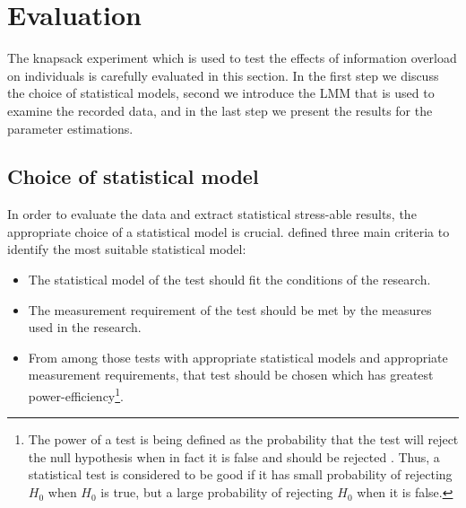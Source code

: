 
\chapter{Evaluation}
\label{ch:Evaluation}

The knapsack experiment which is used to test the effects of information overload on individuals is carefully evaluated in this section. In the first step we discuss the choice of statistical models, second we introduce the \acf{LMM} that is used to examine the recorded data, and in the last step we present the results for the parameter estimations. 

\section{Choice of statistical model}
\label{ch:Evaluation:sec:StatisticalModel}

In order to evaluate the data and extract statistical stress-able results, the appropriate choice of a statistical model is crucial. 
\cite{Siegel1957} defined three main criteria to identify the most suitable statistical model:
\begin{itemize}
\item The statistical model of the test should fit the conditions of the research.
\item The measurement requirement of the test should be met by the measures used in the research.
\item From among those tests with appropriate statistical models and appropriate measurement requirements, that test should be chosen which has greatest power-efficiency\footnote{The power of a test is being defined as the probability that the test will reject the null hypothesis when in fact it is false and should be rejected \citep{Siegel1957}. Thus, a statistical test is considered to be good if it has small probability of rejecting $H_0$ when $H_0$ is true, but a large probability of rejecting $H_0$ when it is false.}.
\end{itemize}

